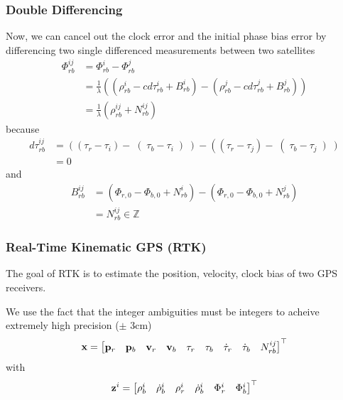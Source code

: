 \documentclass{beamer}
\begin{document}
\begin{frame}\frametitle{Double Differencing}
Now, we can cancel out the clock error and the initial phase bias error by differencing two single differenced measurements between two satellites
\begin{align*}
	\Phi_{rb}^{ij} &=\Phi_{rb}^{i}-\Phi_{rb}^{j} \nonumber\\
	&= \frac{1}{\lambda} \left(\left(\rho_{rb}^i -cd\tau_{rb}^i + B_{rb}^i\right) - \left(\rho_{rb}^j -cd\tau_{rb}^j + B_{rb}^j \right)\right)\\
	&= \frac{1}{\lambda} \left( \rho_{rb}^{ij} + N_{rb}^{ij} \right)
\end{align*}
because 
\begin{align*}
	d\tau_{rb}^{ij} &= \left( \left( \tau_r - \tau_i \right) - \right( \tau_b - \tau_i \left) \right) - \left( \left( \tau_r - \tau_j \right) - \right( \tau_b - \tau_j \left) \right) \\
	&= 0
\end{align*}
and
\begin{align*}
	B_{rb}^{ij} &= \left(\Phi_{r,0}-\Phi_{b,0}+N_{rb}^{i}\right) - \left(\Phi_{r,0}-\Phi_{b,0}+N_{rb}^{j}\right) \\
	&= N_{rb}^{ij} \in \mathbb{Z}
\end{align*}
\end{frame}

\begin{frame}\frametitle{Real-Time Kinematic GPS (RTK)}
   The goal of RTK is to estimate the position, velocity, clock bias of two GPS receivers.

   We use the fact that the integer ambiguities must be integers to acheive extremely high precision ($\pm$ 3cm) 
\begin{equation*}
   \mathbf{x} = \begin{bmatrix} \mathbf{p}_r & \mathbf{p}_b & \mathbf{v}_r & \mathbf{v}_b & \tau_r & \tau_b & \dot{\tau}_r & \dot{\tau}_b & N_{rb}^{ij}\end{bmatrix} ^\top 
\end{equation*}
with
\begin{equation*}
	\mathbf{z}^i = \begin{bmatrix} \rho_b^i & \dot{\rho}_b^i & \rho_r^i & \dot{\rho}_b^i & \Phi_r^i & \Phi_b^i \end{bmatrix} ^\top
\end{equation*}
\end{frame}
\end{document}
